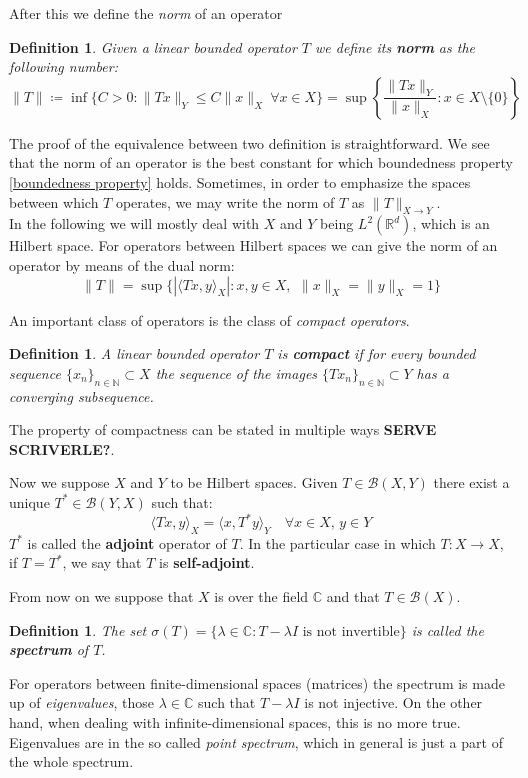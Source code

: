 \documentclass[corpo=11pt, stile=classica, tipotesi=custom,
greek, evenboxes, english]{toptesi}
\numberwithin{equation}{chapter}
\newtheorem{defi}[teo]{Definition}
\newcommand{\R}{\mathbb{R}} %
\newcommand{\N}{\mathbb{N}} %
\newcommand{\C}{\mathbb{C}} %
\newcommand{\B}{\mathscr{B}} %
\begin{document}
After this we define the \emph{norm} of an operator
\begin{defi}\label{norm operator}
	Given a linear bounded operator $T$ we define its \textbf{norm} as the following number:
	\begin{equation*}
		\|T\| \coloneqq \inf\{C>0 : \| Tx \|_Y \leq C \| x \|_X \  \forall x \in X\} = \sup \left\{ \dfrac{\| Tx \|_Y}{\| x \|_X} : x \in X \setminus \{0\}\right\}
	\end{equation*}
\end{defi}
The proof of the equivalence between two definition is straightforward. We see that the norm of an operator is the best constant for which boundedness property \eqref{boundedness property} holds. {\color{blue} Sometimes, in order to emphasize the spaces between which $T$ operates, we may write the norm of $T$ as $\| T \|_{X \rightarrow Y}$.}\\
In the following we will mostly deal with $X$ and $Y$ being $L^2(\R^d)$, which is an Hilbert space. For operators between Hilbert spaces we can give the norm of an operator by means of the dual norm:
\begin{equation*}
	\| T \| = \sup\{|\langle Tx, y \rangle_X| : x,y \in X,\,\ \|x\|_X = \|y\|_X = 1 \}
\end{equation*}

An important class of operators is the class of \emph{compact operators}.
\begin{defi}\label{compact operator}
	A linear bounded operator $T$ is \textbf{compact} if for every bounded sequence $\{x_n\}_{n \in \N} \subset X$ the sequence of the images $\{Tx_n\}_{n \in \N} \subset Y$ has a converging subsequence.
\end{defi}
The property of compactness can be stated in multiple ways \textbf{SERVE SCRIVERLE?}.

Now we suppose $X$ and $Y$ to be Hilbert spaces. Given $T \in \B(X,Y)$ there exist a unique $T^* \in \B(Y,X)$ such that:
\begin{equation*}
	\langle Tx, y \rangle_X = \langle x, T^* y \rangle_Y \quad \forall x \in X,\,y \in Y
\end{equation*}
$T^*$ is called the \textbf{adjoint} operator of $T$. In the particular case in which $T : X \rightarrow X$, if $T=T^*$, we say that $T$ is \textbf{self-adjoint}.

From now on we suppose that $X$ is over the field $\C$ and that $T \in \B(X)$.
\begin{defi}\label{spectrum def}
	The set $\sigma(T) = \{\lambda \in \C : T - \lambda I \text{ is not invertible}\}$ is called  the \textbf{spectrum} of $T$.
\end{defi}
For operators between finite-dimensional spaces (matrices) the spectrum is made up of \emph{eigenvalues}, those $\lambda \in \C$ such that $T-\lambda I$ is not injective. On the other hand, when dealing with infinite-dimensional spaces, this is no more true. Eigenvalues are in the so called \emph{point spectrum}, which in general is just a part of the whole spectrum.
\end{document}
